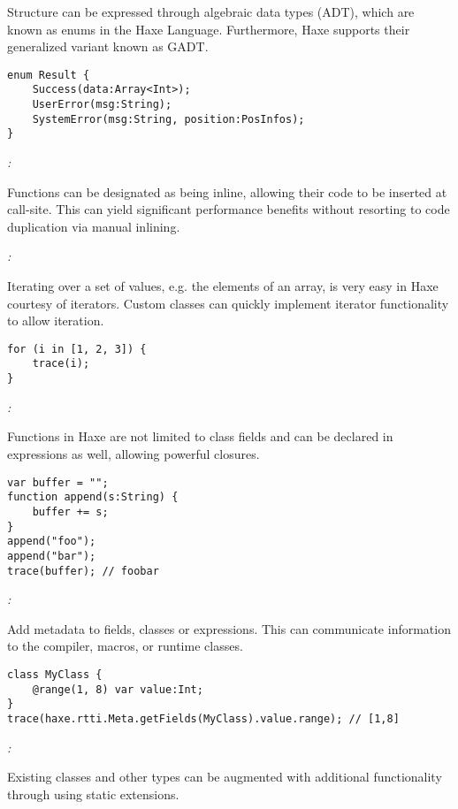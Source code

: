 Structure can be expressed through algebraic data types (ADT), which are known as enums in the Haxe Language. Furthermore, Haxe supports their generalized variant known as GADT.

\begin{lstlisting}
enum Result {
    Success(data:Array<Int>);
    UserError(msg:String);
    SystemError(msg:String, position:PosInfos);
}
\end{lstlisting}

\emph{:}

Functions can be designated as being inline, allowing their code to be inserted at call-site. This can yield significant performance benefits without resorting to code duplication via manual inlining.

\emph{:}

Iterating over a set of values, e.g. the elements of an array, is very easy in Haxe courtesy of iterators. Custom classes can quickly implement iterator functionality to allow iteration.

\begin{lstlisting}
for (i in [1, 2, 3]) {
    trace(i);
}
\end{lstlisting}

\emph{:}

Functions in Haxe are not limited to class fields and can be declared in expressions as well, allowing powerful closures.

\begin{lstlisting}
var buffer = "";
function append(s:String) {
    buffer += s;
}
append("foo");
append("bar");
trace(buffer); // foobar
\end{lstlisting}

\emph{:}

Add metadata to fields, classes or expressions. This can communicate information to the compiler, macros, or runtime classes.

\begin{lstlisting}
class MyClass {
    @range(1, 8) var value:Int;
}
trace(haxe.rtti.Meta.getFields(MyClass).value.range); // [1,8]
\end{lstlisting}

\emph{:}

Existing classes and other types can be augmented with additional functionality through using static extensions.

